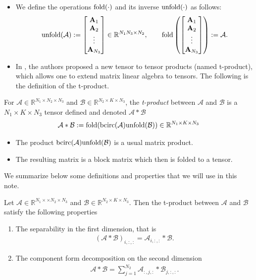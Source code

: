 \documentclass[aspectratio=169]{beamer}
\newcommand{\mcalB}{\fm B}
\def\r{\right}
\def\mbf{\mathbf}
\def\bcirc{{\rm bcirc}}
\def\unfold{{\rm unfold}}
\def\fold{{\rm fold}}
\def\mcala{\mathcal A}
\def\mcalb{\mathcal B}
\def\mbbr{\mathbb R}
\newcommand{\bem}{\begin{bmatrix}}\newcommand{\eem}{\end{bmatrix}}
\def\fm#1{\mathcal{#1}}
\def\r{\mathbb{R}}
\def\fm#1{\mathcal{#1}}
\def\r{\mathbb{R}}
\begin{document}
\begin{frame}{}
\begin{itemize}
\item We define the operations $\fold(\cdot)$ and its inverse $\unfold(\cdot)$ as follows:
$$
\unfold(\mcala):=\bem\mbf A_1\\ \mbf A_2\\ \vdots\\ \mbf A_{N_3}\eem\in\mbbr^{N_1N_3\times N_2},\qquad \fold\left(\bem\mbf A_1\\ \mbf A_2\\ \vdots\\ \mbf A_{N_3}\eem\right):=\mcala.
$$ 
\item In \cite{kilmer2013third}, the authors proposed a new tensor to tensor products (named t-product), which allows one to extend matrix linear algebra to tensors. The following is the definition of the t-product.
\end{itemize}
\end{frame}
\begin{frame}{}
\begin{definition}
    For $\mcala\in\mbbr^{N_1\times N_2\times N_3}$ and $\mcalb\in\mbbr^{N_2\times K\times N_3}$, the {\it t-product} between $\mcala$ and $\mcalb $ is  a $ N_1\times K\times N_3$ tensor  defined and denoted  $\mcala*\mcalb$ 
$$
\mcala*\mcalb:=\fold(\bcirc(\mcala)\unfold(\mcalb))\in \r^{N_1\times K\times N_3}
$$
\end{definition}
\begin{itemize}
    \item The product $\bcirc(\mcala) \unfold(\mcalB)$ is a usual matrix product.
    \item The resulting matrix is a block matrix which then is folded to a tensor.
\end{itemize}
\end{frame}
\begin{frame}{}
We summarize below some definitions and properties that we will use in this note.
\begin{definition}
Let $\mcala \in \r^{N_1\times \times N_2 \times N_3}$ and $\mcalb \in \r^{N_2\times K\times N_3}$. Then the t-product between $\fm A $ and $\fm B$ satisfy the following properties
\begin{enumerate}
    \item The separability in the first dimension, that is 
    \begin{align*}
        \left( \fm A * \fm B\right)_{i, :, :} = \fm A_{i, :, :} * \fm B.
    \end{align*}
    \item  The component form decomposition on the second dimension
    \begin{align}
        \fm A * \fm B = \sum_{j=1}^{N_2} \fm A_{:, j, :} * \fm B_{j, :, :}.
    \end{align}
\end{enumerate}
\end{definition}
\end{frame}
\end{document}
